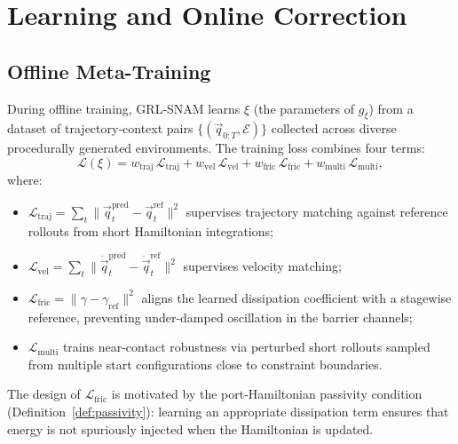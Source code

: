 \section{Learning and Online Correction}
\label{sec:ch3:learning}

\subsection{Offline Meta-Training}
\label{subsec:ch3:offline}

During offline training, GRL-SNAM learns $\xi$ (the parameters of $g_\xi$)
from a dataset of trajectory-context pairs $\{(\vec{q}_{0:T}, \mathcal{E})\}$
collected across diverse procedurally generated environments.
The training loss combines four terms:
\begin{equation}
  \mathcal{L}(\xi)
  = w_{\mathrm{traj}}\,\mathcal{L}_{\mathrm{traj}}
  + w_{\mathrm{vel}}\,\mathcal{L}_{\mathrm{vel}}
  + w_{\mathrm{fric}}\,\mathcal{L}_{\mathrm{fric}}
  + w_{\mathrm{multi}}\,\mathcal{L}_{\mathrm{multi}},
  \label{eq:ch3:loss}
\end{equation}
where:
\begin{itemize}
  \item $\mathcal{L}_{\mathrm{traj}} = \sum_t \|\vec{q}_t^{\mathrm{pred}}
        - \vec{q}_t^{\mathrm{ref}}\|^2$ supervises trajectory matching
        against reference rollouts from short Hamiltonian integrations;
  \item $\mathcal{L}_{\mathrm{vel}} = \sum_t \|\dot{\vec{q}}_t^{\mathrm{pred}}
        - \dot{\vec{q}}_t^{\mathrm{ref}}\|^2$ supervises velocity matching;
  \item $\mathcal{L}_{\mathrm{fric}} = \|\gamma - \gamma_{\mathrm{ref}}\|^2$
        aligns the learned dissipation coefficient with a stagewise
        reference, preventing under-damped oscillation in the barrier
        channels;
  \item $\mathcal{L}_{\mathrm{multi}}$ trains near-contact robustness via
        perturbed short rollouts sampled from multiple start configurations
        close to constraint boundaries.
\end{itemize}
The design of $\mathcal{L}_{\mathrm{fric}}$ is motivated by the
port-Hamiltonian passivity condition (Definition~\ref{def:passivity}):
learning an appropriate dissipation term ensures that energy is not
spuriously injected when the Hamiltonian is updated.

